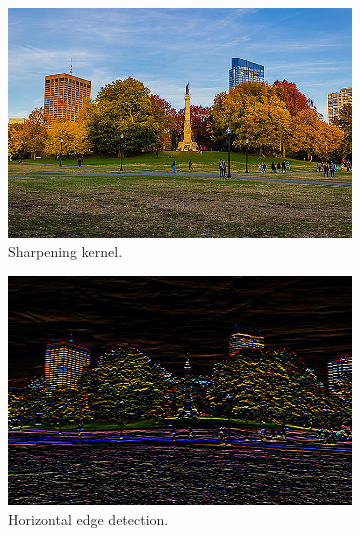 \begin{example}
\begin{figure}[H]
      \begin{subfigure}[b]{0.32\textwidth}
      \centering
          \includegraphics[width=\textwidth]{img/03_CNN/Sharpen.png}
          \caption{Sharpening kernel. } \label{fig:sharpened_image}
      \end{subfigure} 
      \begin{subfigure}[b]{0.32\textwidth}
      \centering
          \includegraphics[width=\textwidth]{img/03_CNN/Horizontal.png}
          \caption{Horizontal edge detection. }
          \label{fig:horizontal_edge}
      \end{subfigure}
      \begin{subfigure}[b]{0.32\textwidth}
      \centering

\end{subfigure}
\end{figure}
\end{example}
